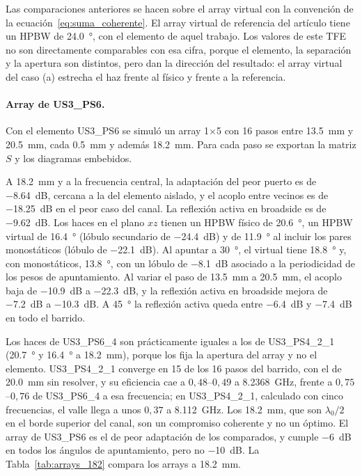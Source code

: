 \documentclass[11pt,a4paper]{article}
\begin{document}
Las comparaciones anteriores se hacen sobre el array virtual con la convención de la
ecuación~\eqref{eq:suma_coherente}. El array virtual de referencia del artículo tiene un HPBW de
\SI{24.0}{\degree}, con el elemento de aquel trabajo. Los valores de este TFE no son directamente
comparables con esa cifra, porque el elemento, la separación y la apertura son distintos, pero dan
la dirección del resultado: el array virtual del caso (a) estrecha el haz frente al físico y frente
a la referencia.

\paragraph{Array de US3\_PS6.} Con el elemento US3\_PS6 se simuló un array 1$\times$5 con 16 pasos entre \SI{13.5}{mm} y \SI{20.5}{mm}, cada \SI{0.5}{mm} y además \SI{18.2}{mm}. Para cada paso se exportan la matriz $S$ y los diagramas embebidos.

A \SI{18.2}{mm} y a la frecuencia central, la adaptación del peor puerto es de \SI{-8.64}{dB}, cercana a la del elemento aislado, y el acoplo entre vecinos es de \SI{-18.25}{dB} en el peor caso del canal. La reflexión activa en broadside es de \SI{-9.62}{dB}. Los haces en el plano $xz$ tienen un HPBW físico de \SI{20.6}{\degree}, un HPBW virtual de \SI{16.4}{\degree} (lóbulo secundario de \SI{-24.4}{dB}) y de \SI{11.9}{\degree} al incluir los pares monostáticos (lóbulo de \SI{-22.1}{dB}). Al apuntar a \SI{30}{\degree}, el virtual tiene \SI{18.8}{\degree} y, con monostáticos, \SI{13.8}{\degree}, con un lóbulo de \SI{-8.1}{dB} asociado a la periodicidad de los pesos de apuntamiento. Al variar el paso de \SI{13.5}{mm} a \SI{20.5}{mm}, el acoplo baja de \SI{-10.9}{dB} a \SI{-22.3}{dB}, y la reflexión activa en broadside mejora de \SI{-7.2}{dB} a \SI{-10.3}{dB}. A \SI{45}{\degree} la reflexión activa queda entre \SI{-6.4}{dB} y \SI{-7.4}{dB} en todo el barrido.

Los haces de US3\_PS6\_4 son prácticamente iguales a los de US3\_PS4\_2\_1 (\SI{20.7}{\degree} y \SI{16.4}{\degree} a \SI{18.2}{mm}), porque los fija la apertura del array y no el elemento. US3\_PS4\_2\_1 converge en 15 de los 16 pasos del barrido, con el de \SI{20.0}{mm} sin resolver, y su eficiencia cae a $0{,}48$--$0{,}49$ a \SI{8.2368}{GHz}, frente a $0{,}75$--$0{,}76$ de US3\_PS6\_4 a esa frecuencia; en US3\_PS4\_2\_1, calculado con cinco frecuencias, el valle llega a unos $0{,}37$ a \SI{8.112}{GHz}. Los \SI{18.2}{mm}, que son $\lambda_0/2$ en el borde superior del canal, son un compromiso coherente y no un óptimo. El array de US3\_PS6 es el de peor adaptación de los comparados, y cumple \SI{-6}{dB} en todos los ángulos de apuntamiento, pero no \SI{-10}{dB}. La Tabla~\ref{tab:arrays_182} compara los arrays a \SI{18.2}{mm}.
\end{document}
